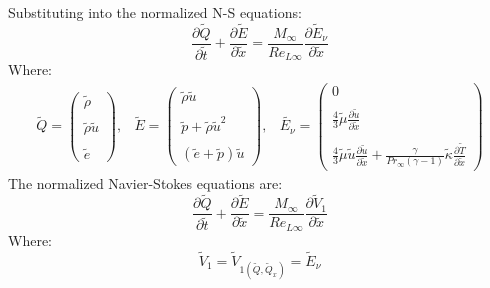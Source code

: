 \documentclass[11pt, a4paper]{article}
\newcommand{\parder}[2]{\frac{\partial {#1}}{\partial {#2}}}
\begin{document}
Substituting into the normalized N-S equations:
\begin{equation}
    \parder{\tilde{Q}}{\tilde{t}}+\parder{\tilde{E}}{\tilde{x}}=\frac{M_\infty}{Re_{L\infty}}\parder{\tilde{E}_\nu}{\tilde{x}}
\end{equation}
Where:
\begin{equation}
    \begin{matrix}
        \tilde{Q}=\begin{pmatrix}
        \tilde{\rho} \\\\
        \tilde{\rho}\tilde{u} \\\\
        \tilde{e}
        \end{pmatrix}, & \tilde{E}=\begin{pmatrix}
        \tilde{\rho}\tilde{u} \\\\
        \tilde{p}+\tilde{\rho}\tilde{u}^2 \\\\
        \left(\tilde{e}+\tilde{p}\right)\tilde{u}
        \end{pmatrix}, & \tilde{E_\nu}=\begin{pmatrix}
        0 \\\\
        \displaystyle\frac{4}{3}\tilde{\mu} \parder{\tilde{u}}{\tilde{x}} \\\\
        \displaystyle\frac{4}{3}\tilde{\mu}\tilde{u}\parder{\tilde{u}}{\tilde{x}}+\frac{\gamma}{Pr_\infty\left(\gamma-1\right)}\tilde{\kappa}\parder{\tilde{T}}{\tilde{x}}
        \end{pmatrix}
    \end{matrix}
\end{equation}
The normalized Navier-Stokes equations are:
\begin{equation}
    \parder{\tilde{Q}}{\tilde{t}}+\parder{\tilde{E}}{\tilde{x}}=\frac{M_\infty}{Re_{L\infty}}\parder{\tilde{V}_1}{\tilde{x}}
\end{equation}
Where:
\begin{equation*}
    \tilde{V}_1=\tilde{V}_{1\left(\tilde{Q},\tilde{Q}_x\right)}=\tilde{E}_\nu
\end{equation*}

\end{document}
